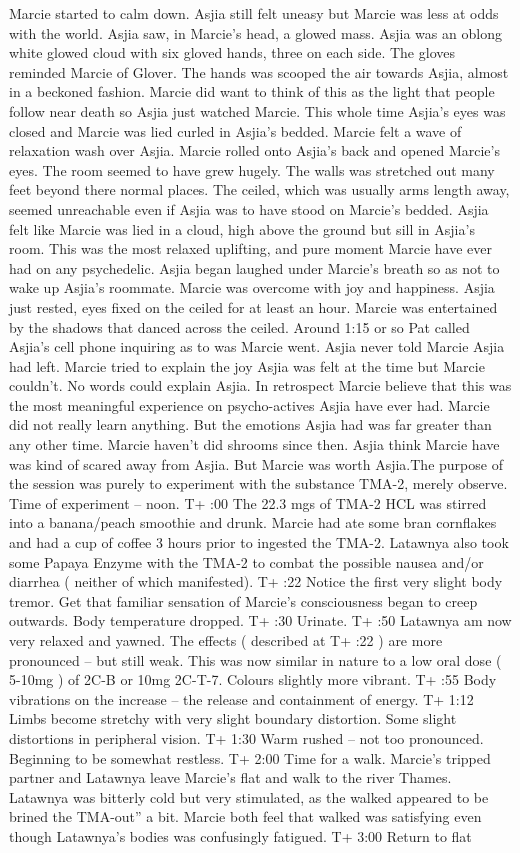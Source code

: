 \documentclass[12pt]{book}
\begin{document}
Marcie started to calm down. Asjia still felt uneasy but Marcie was less at odds with the world. Asjia saw, in Marcie's head, a glowed mass. Asjia was an oblong white glowed cloud with six gloved hands, three on each side. The gloves reminded Marcie of Glover. The hands was scooped the air towards Asjia, almost in a beckoned fashion. Marcie did want to think of this as the light that people follow near death so Asjia just watched Marcie. This whole time Asjia's eyes was closed and Marcie was lied curled in Asjia's bedded. Marcie felt a wave of relaxation wash over Asjia. Marcie rolled onto Asjia's back and opened Marcie's eyes. The room seemed to have grew hugely. The walls was stretched out many feet beyond there normal places. The ceiled, which was usually arms length away, seemed unreachable even if Asjia was to have stood on Marcie's bedded. Asjia felt like Marcie was lied in a cloud, high above the ground but sill in Asjia's room. This was the most relaxed uplifting, and pure moment Marcie have ever had on any psychedelic. Asjia began laughed under Marcie's breath so as not to wake up Asjia's roommate. Marcie was overcome with joy and happiness. Asjia just rested, eyes fixed on the ceiled for at least an hour. Marcie was entertained by the shadows that danced across the ceiled. Around 1:15 or so Pat called Asjia's cell phone inquiring as to was Marcie went. Asjia never told Marcie Asjia had left. Marcie tried to explain the joy Asjia was felt at the time but Marcie couldn't. No words could explain Asjia. In retrospect Marcie believe that this was the most meaningful experience on psycho-actives Asjia have ever had. Marcie did not really learn anything. But the emotions Asjia had was far greater than any other time. Marcie haven't did shrooms since then. Asjia think Marcie have was kind of scared away from Asjia. But Marcie was worth Asjia.The purpose of the session was purely to experiment with the substance TMA-2, merely observe. Time of experiment -- noon. T+ :00 The 22.3 mgs of TMA-2 HCL was stirred into a banana/peach smoothie and drunk. Marcie had ate some bran cornflakes and had a cup of coffee 3 hours prior to ingested the TMA-2. Latawnya also took some Papaya Enzyme with the TMA-2 to combat the possible nausea and/or diarrhea ( neither of which manifested). T+ :22 Notice the first very slight body tremor. Get that familiar sensation of Marcie's consciousness began to creep outwards. Body temperature dropped. T+ :30 Urinate. T+ :50 Latawnya am now very relaxed and yawned. The effects ( described at T+ :22 ) are more pronounced -- but still weak. This was now similar in nature to a low oral dose ( 5-10mg ) of 2C-B or 10mg 2C-T-7. Colours slightly more vibrant. T+ :55 Body vibrations on the increase -- the release and containment of energy. T+ 1:12 Limbs become stretchy with very slight boundary distortion. Some slight distortions in peripheral vision. T+ 1:30 Warm rushed -- not too pronounced. Beginning to be somewhat restless. T+ 2:00 Time for a walk. Marcie's tripped partner and Latawnya leave Marcie's flat and walk to the river Thames. Latawnya was bitterly cold but very stimulated, as the walked appeared to be brined the TMA-out'' a bit. Marcie both feel that walked was satisfying even though Latawnya's bodies was confusingly fatigued. T+ 3:00 Return to flat 
\end{document}
